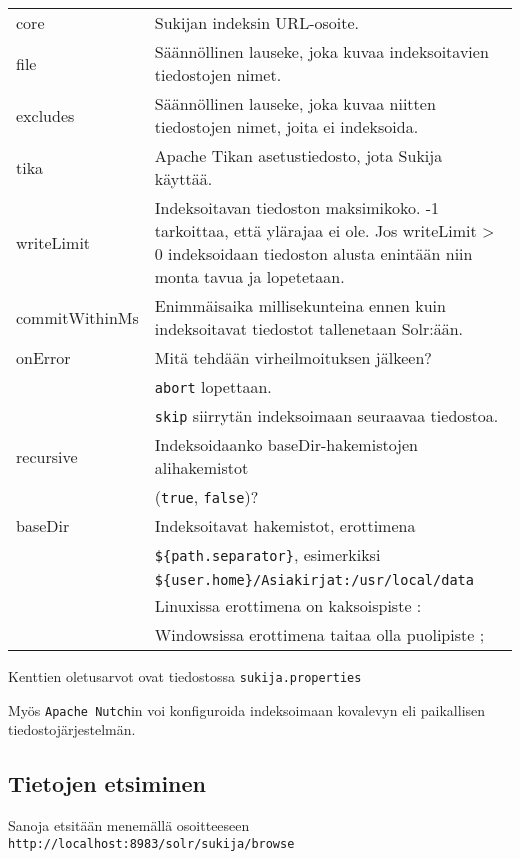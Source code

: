 \documentclass[12pt]{article}
\begin{document}
\begin{tabularx}{\textwidth}{@{}lX}
core           & Sukijan indeksin URL-osoite. \\
file           & Säännöllinen lauseke, joka kuvaa indeksoitavien tiedostojen nimet. \\
excludes       & Säännöllinen lauseke, joka kuvaa niitten tiedostojen nimet, joita ei indeksoida. \\
tika           & Apache Tikan asetustiedosto, jota Sukija käyttää. \\
writeLimit     & Indeksoitavan tiedoston maksimikoko. -1 tarkoittaa, että ylärajaa ei ole.
                 Jos writeLimit > 0 indeksoidaan tiedoston alusta enintään niin monta tavua ja lopetetaan. \\
commitWithinMs & Enimmäisaika millisekunteina ennen kuin indeksoitavat tiedostot tallenetaan Solr:ään. \\
onError        & Mitä tehdään virheilmoituksen jälkeen? \\
               & \texttt{abort} lopettaan. \\
               & \texttt{skip} siirrytän indeksoimaan seuraavaa tiedostoa. \\
recursive      & Indeksoidaanko baseDir-hakemistojen alihakemistot \\
               & (\texttt{true}, \texttt{false})? \\
baseDir        & Indeksoitavat hakemistot, erottimena \\
               & \texttt{\$\{path.separator\}}, esimerkiksi \\
               & \texttt{\$\{user.home\}/Asiakirjat:/usr/local/data} \\
               & Linuxissa erottimena on kaksoispiste : \\
               & Windowsissa erottimena taitaa olla puolipiste ;
\end{tabularx}

Kenttien oletusarvot ovat tiedostossa \verb=sukija.properties=

Myös \verb=Apache Nutch=in voi konfiguroida indeksoimaan kovalevyn
eli paikallisen tiedostojärjestelmän.


\subsection*{Tietojen etsiminen}

Sanoja etsitään menemällä osoitteeseen
\verb=http://localhost:8983/solr/sukija/browse=
\end{document}
